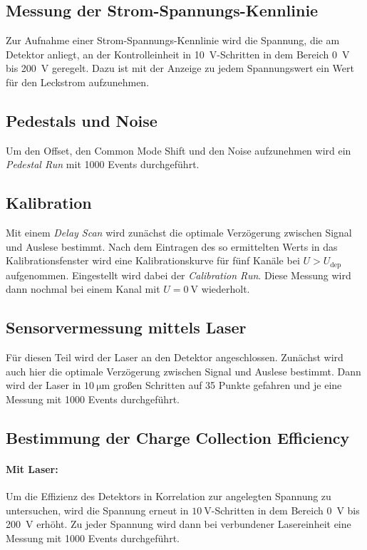 \subsection{Messung der Strom-Spannungs-Kennlinie}
Zur Aufnahme einer Strom-Spannungs-Kennlinie wird die Spannung, die am Detektor anliegt, an der Kontrolleinheit in \SI{10}{\volt}-Schritten in dem Bereich \SI{0}{\volt} bis \SI{200}{\volt} geregelt. Dazu ist mit der Anzeige zu jedem Spannungswert ein Wert für den Leckstrom aufzunehmen.

\subsection{Pedestals und Noise}
Um den Offset, den Common Mode Shift und den Noise aufzunehmen wird ein \textit{Pedestal Run} mit 1000 Events durchgeführt.

\subsection{Kalibration}
Mit einem \textit{Delay Scan} wird zunächst die optimale Verzögerung zwischen Signal und Auslese bestimmt. Nach dem Eintragen des so ermittelten Werts in das Kalibrationsfenster wird eine Kalibrationskurve für fünf Kanäle bei $U > U_\text{dep}$ aufgenommen. Eingestellt wird dabei der \textit{Calibration Run}. Diese Messung wird dann nochmal bei einem Kanal mit $U=\SI{0}{\volt}$ wiederholt.

\subsection{Sensorvermessung mittels Laser}
Für diesen Teil wird der Laser an den Detektor angeschlossen.
Zunächst wird auch hier die optimale Verzögerung zwischen Signal und Auslese bestimmt.
Dann wird der Laser in $\SI{10}{\micro\meter}$ großen Schritten auf 35 Punkte gefahren und je eine Messung mit 1000 Events durchgeführt.

\subsection{Bestimmung der Charge Collection Efficiency}
\paragraph{Mit Laser:}
Um die Effizienz des Detektors in Korrelation zur angelegten Spannung zu untersuchen, wird die Spannung erneut in $\SI{10}{\volt}$-Schritten in dem Bereich \SI{0}{\volt} bis \SI{200}{\volt} erhöht. Zu jeder Spannung wird dann bei verbundener Lasereinheit eine Messung mit 1000 Events durchgeführt.
